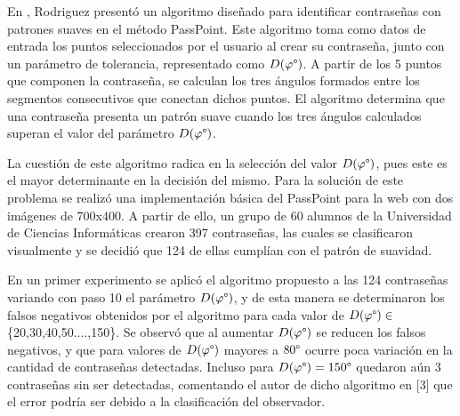 \documentclass[12pt]{report}
\begin{document}
En \cite{3}, Rodriguez presentó un algoritmo diseñado para identificar contraseñas con patrones suaves en el método PassPoint. Este algoritmo toma como datos de entrada los puntos seleccionados por el usuario al crear su contraseña, junto con un parámetro de tolerancia, representado como $D(\varphi\degree)$. A partir de los 5 puntos que componen la contraseña, se calculan los tres ángulos formados entre los segmentos consecutivos que conectan dichos puntos. El algoritmo determina que una contraseña presenta un patrón suave cuando los tres ángulos calculados superan el valor del parámetro $D(\varphi\degree)$.

La cuestión de este algoritmo radica en la selección del valor $D(\varphi\degree)$, pues este es el mayor determinante en la decisión del mismo. Para la solución de este problema se realizó una implementación básica del PassPoint para la web con dos imágenes de 700x400. A partir de ello, un grupo de 60 alumnos de la Universidad de Ciencias Informáticas crearon 397 contraseñas, las cuales se clasificaron visualmente y se decidió que 124 de ellas cumplían con el patrón de suavidad. 

En un primer experimento se aplicó el algoritmo propuesto a las 124 contraseñas variando con paso 10 el parámetro $D(\varphi\degree)$, y de esta manera se determinaron los falsos negativos obtenidos por el algoritmo para cada valor de $D(\varphi\degree)\in$ \{20,30,40,50....,150\}. Se observó que al aumentar $D(\varphi\degree)$ se reducen los falsos negativos, y que para valores de $D(\varphi\degree)$ mayores a $80\degree$  ocurre poca variación en la cantidad de contraseñas detectadas. Incluso para $D(\varphi\degree)=150\degree$ quedaron aún 3 contraseñas sin ser detectadas, comentando el autor de dicho algoritmo en [3] que el error podría ser debido a la clasificación del observador.  
\end{document}
